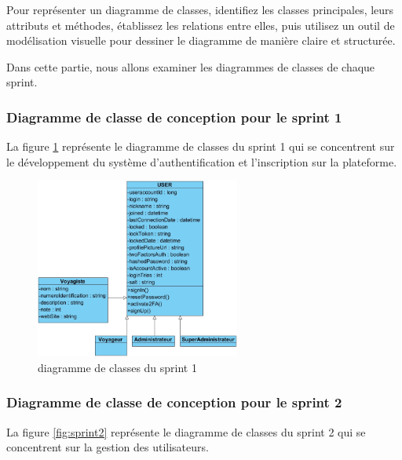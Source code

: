 \documentclass[12pt]{report}
\begin{document}
				\hspace{15pt} Pour représenter un diagramme de classes, identifiez les classes principales, leurs attributs et méthodes, établissez les relations entre elles, puis utilisez un outil de modélisation visuelle pour dessiner le diagramme de manière claire et structurée.

				Dans cette partie, nous allons examiner les diagrammes de classes de chaque sprint.

				\subsubsection{Diagramme de classe de conception pour le sprint 1}

				\hspace{15pt} La figure \ref{fig:sprint1} représente le diagramme de classes du sprint 1 qui se concentrent sur le développement du système d’authentification et l’inscription sur la plateforme.

			\begin{figure}[h]
				\centering
				\includegraphics[width=0.6\textwidth]{sprint1.jpg}
				\caption{diagramme de classes du sprint 1}
				\label{fig:sprint1}
			\end{figure}
			\FloatBarrier

				\subsubsection{Diagramme de classe de conception pour le sprint 2}
				
			           \hspace{15pt} La figure \ref{fig:sprint2} représente le diagramme de classes du sprint 2 qui se concentrent sur la gestion des utilisateurs.
\end{document}
